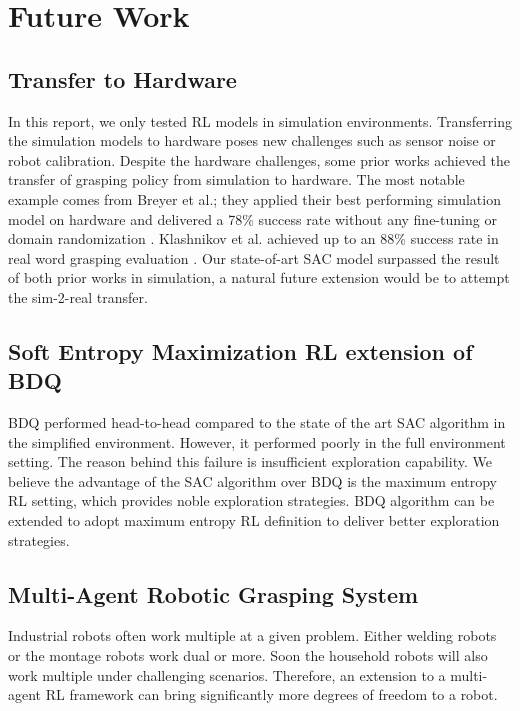 \section{Future Work}

\subsection{Transfer to Hardware}
 
In this report, we only tested RL models in simulation environments. Transferring the simulation models to hardware poses new challenges such as sensor noise or robot calibration. Despite the hardware challenges, some prior works achieved the transfer of grasping policy from simulation to hardware. The most notable example comes from Breyer et al.; they applied their best performing simulation model on hardware and delivered a 78\% success rate without any fine-tuning or domain randomization \cite{Breyer2018}. Klashnikov et al. achieved up to an 88\% success rate in real word grasping evaluation \cite{Kalashnikov2018}. Our state-of-art SAC model surpassed the result of both prior works in simulation, a natural future extension would be to attempt the sim-2-real transfer.
 
\subsection{Soft Entropy Maximization RL extension of BDQ}
 
BDQ performed head-to-head compared to the state of the art SAC algorithm in the simplified environment. However, it performed poorly in the full environment setting. The reason behind this failure is insufficient exploration capability. We believe the advantage of the SAC algorithm over BDQ is the maximum entropy RL setting, which provides noble exploration strategies. BDQ algorithm can be extended to adopt maximum entropy RL definition to deliver better exploration strategies.
 
\subsection{Multi-Agent Robotic Grasping System}
 
Industrial robots often work multiple at a given problem. Either welding robots or the montage robots work dual or more. Soon the household robots will also work multiple under challenging scenarios. Therefore, an extension to a multi-agent RL framework can bring significantly more degrees of freedom to a robot. 
 
